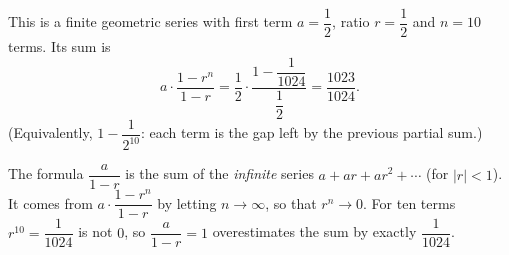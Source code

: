 This is a finite geometric series with first term $a=\dfrac{1}{2}$, ratio $r=\dfrac{1}{2}$ and $n=10$ terms. Its sum is
\[
a\cdot\dfrac{1-r^{n}}{1-r}=\dfrac{1}{2}\cdot\dfrac{1-\dfrac{1}{1024}}{\dfrac{1}{2}}=\boxed{\dfrac{1023}{1024}} .
\]
(Equivalently, $1-\dfrac{1}{2^{10}}$: each term is the gap left by the previous partial sum.)

The formula $\dfrac{a}{1-r}$ is the sum of the \emph{infinite} series $a+ar+ar^2+\cdots$ (for $|r|<1$). It comes from $a\cdot\dfrac{1-r^n}{1-r}$ by letting $n\to\infty$, so that $r^n\to0$. For ten terms $r^{10}=\dfrac{1}{1024}$ is not $0$, so $\dfrac{a}{1-r}=1$ overestimates the sum by exactly $\dfrac{1}{1024}$.
